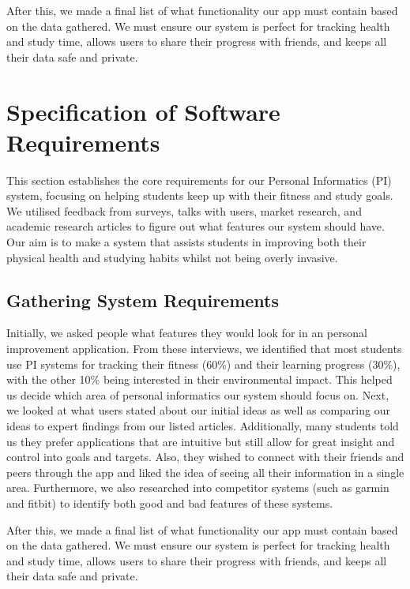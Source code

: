 \documentclass[12pt]{article}
\begin{document}
After this, we made a final list of what functionality our app must contain based on the data gathered. We must
ensure our system is perfect for tracking health and study time, allows users
to share their progress with friends, and keeps all their data safe and
private.
 

\newpage
\section{Specification of Software Requirements}

This section establishes the core requirements for our Personal Informatics
(PI) system, focusing on helping students keep up with their fitness and study
goals. We utilised feedback from surveys, talks with users, market research,
and academic research articles to figure out what features our system should have. Our
aim is to make a system that assists students in improving both their physical
health and studying habits whilst not being overly invasive.


\subsection{Gathering System Requirements}

Initially, we asked people what features they would look for in an personal
improvement application. From these interviews, we identified that most students use PI systems for
tracking their fitness (60\%) and their learning progress (30\%), with the other 10\% being interested in their environmental impact. This
helped us decide which area of personal informatics our system should focus on. Next, we looked
at what users stated about our initial ideas as well as comparing our ideas
to expert findings from our listed articles. Additionally, many students told us they prefer applications
that are intuitive but still allow for great insight and control into goals
and targets. Also, they wished to connect with their friends and peers through the app and
liked the idea of seeing all their information in a single area. Furthermore, we also researched into competitor 
systems (such as garmin and fitbit) to identify both good and bad features of these systems.\par

After this, we made a final list of what functionality our app must contain based on the data gathered. We must
ensure our system is perfect for tracking health and study time, allows users
to share their progress with friends, and keeps all their data safe and
private.
 
\end{document}
